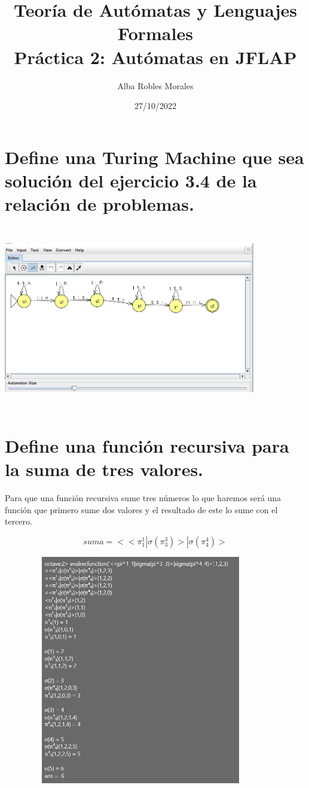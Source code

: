 \documentclass[fleqn, 10pt]{article}
\title{Teoría de Autómatas y Lenguajes Formales\\[.4\baselineskip]Práctica 2: Autómatas en JFLAP}
\author{Alba Robles Morales}
\date{27/10/2022}
\theoremstyle{plain}
\theoremstyle{definition}
\begin{document}
\maketitle

\section{Define una Turing Machine que sea solución del ejercicio 3.4 de la relación de problemas. }

\begin{center}
\includegraphics[width=11cm, height=8cm]{1_pract3.png}
\end{center}

\section {Define una función recursiva para la suma de tres valores.}

Para que una función recursiva sume tres números lo que haremos será una función que primero sume dos valores y el resultado de este lo sume con el tercero.

\begin{equation}
suma=<<\pi^1_1|\sigma(\pi^3_3)>|\sigma(\pi^4_4)>
\end {equation}
\begin{center}
\includegraphics[width=12cm, height=10cm]{talf_pract3_ej2.png}
\end{center}
\end{document}
